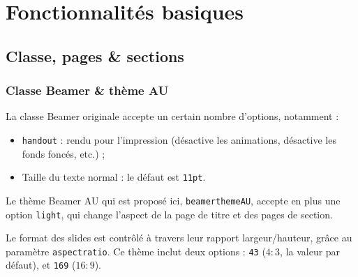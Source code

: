 \documentclass[10pt,    %
    french,             %
    xcolor=table,       %
    envcountsect,       %
    aspectratio=43      %
]{beamer}
\begin{document}
\section{Fonctionnalités basiques}
\label{sec:basics}
\sectionframe

\subsection{Classe, pages \& sections}
\begin{frame}
    \frametitle{Classe Beamer \& thème AU}
    
    La classe Beamer originale accepte un certain nombre d'options, notamment :
    \begin{itemize}
        \item \texttt{handout} : rendu pour l'impression (désactive les animations, désactive les fonds foncés, etc.) ;
        \item Taille du texte normal : le défaut est \texttt{11pt}.
    \end{itemize}

    \vspace{0.25cm}
    Le thème Beamer AU qui est proposé ici, \texttt{beamerthemeAU}, accepte en plus une option \texttt{light}, qui change l'aspect de la page de titre et des pages de section.
    
    \vspace{0.25cm}
    Le format des slides est contrôlé à travers leur rapport largeur/hauteur, grâce au paramètre \texttt{aspectratio}. Ce thème inclut deux options : \texttt{43} ($4{:}3$, la valeur par défaut), et \texttt{169} ($16{:}9$).
\end{frame}
\end{document}
